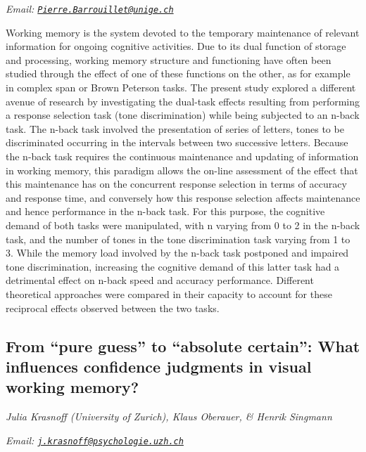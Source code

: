 \documentclass[
  12pt,
]{book}
\begin{document}
\emph{Email: \href{mailto:Pierre.Barrouillet@unige.ch}{\nolinkurl{Pierre.Barrouillet@unige.ch}}}

Working memory is the system devoted to the temporary maintenance of relevant information for ongoing cognitive activities. Due to its dual function of storage and processing, working memory structure and functioning have often been studied through the effect of one of these functions on the other, as for example in complex span or Brown Peterson tasks. The present study explored a different avenue of research by investigating the dual-task effects resulting from performing a response selection task (tone discrimination) while being subjected to an n-back task. The n-back task involved the presentation of series of letters, tones to be discriminated occurring in the intervals between two successive letters. Because the n-back task requires the continuous maintenance and updating of information in working memory, this paradigm allows the on-line assessment of the effect that this maintenance has on the concurrent response selection in terms of accuracy and response time, and conversely how this response selection affects maintenance and hence performance in the n-back task. For this purpose, the cognitive demand of both tasks were manipulated, with n varying from 0 to 2 in the n-back task, and the number of tones in the tone discrimination task varying from 1 to 3. While the memory load involved by the n-back task postponed and impaired tone discrimination, increasing the cognitive demand of this latter task had a detrimental effect on n-back speed and accuracy performance. Different theoretical approaches were compared in their capacity to account for these reciprocal effects observed between the two tasks.

\hypertarget{from-pure-guess-to-absolute-certain-what-influences-confidence-judgments-in-visual-working-memory}{%
\subsection{From ``pure guess'' to ``absolute certain'': What influences confidence judgments in visual working memory?}\label{from-pure-guess-to-absolute-certain-what-influences-confidence-judgments-in-visual-working-memory}}

\emph{Julia Krasnoff (University of Zurich), Klaus Oberauer, \& Henrik Singmann}

\emph{Email: \href{mailto:j.krasnoff@psychologie.uzh.ch}{\nolinkurl{j.krasnoff@psychologie.uzh.ch}}}
\end{document}
